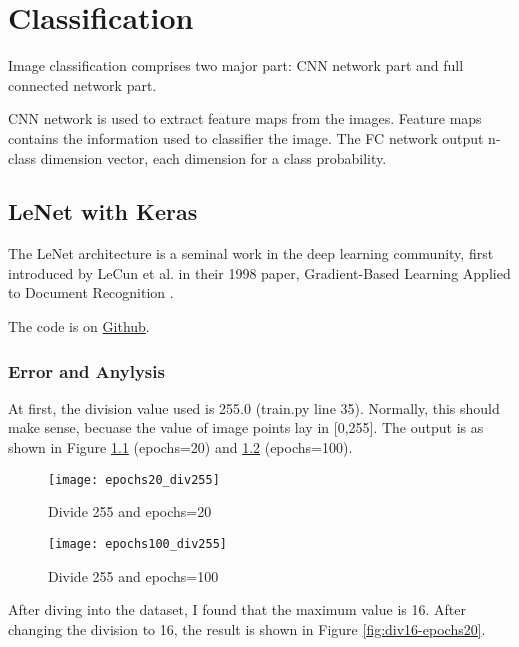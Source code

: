 
\chapter{Classification}

Image classification comprises two major part: CNN network part and full connected network part.


CNN network is used to extract feature maps from the images.
Feature maps contains the information used to classifier the image.
The FC network output n-class dimension vector, each dimension for a class probability.


\section{LeNet with Keras}

The LeNet architecture is a seminal work in the deep learning community, first introduced by LeCun et al. in their 1998 paper, Gradient-Based Learning Applied to Document Recognition \cite{YL98}.

\label{sec:lenet-with-keras}



The code is on \href{https://github.com/mingmingli916/cv_classification}{Github}.


\subsection{Error and Anylysis}

At first, the division value used is 255.0 (train.py line 35).
Normally, this should make sense, becuase the value of image points lay in [0,255].
The output is as shown in Figure \ref{fig:div255-epochs20} (epochs=20) and \ref{fig:div255-epochs100} (epochs=100).
\begin{figure}[!ht]
  \centering
  \texttt{[image: epochs20\_div255]}
  \caption{Divide 255 and epochs=20}
  \label{fig:div255-epochs20}
\end{figure}


\begin{figure}[!ht]
  \centering
  \texttt{[image: epochs100\_div255]}
  \caption{Divide 255 and epochs=100}
  \label{fig:div255-epochs100}
\end{figure}


After diving into the dataset, I found that the maximum value is 16.
After changing the division to 16, the result is shown in Figure \ref{fig:div16-epochs20}.

